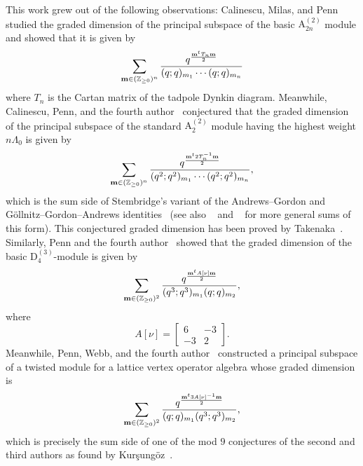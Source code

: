 \documentclass[ALCO,Unicode,published]{cedram}
\begin{document}
This work grew out of the following observations: 
Calinescu, Milas, and Penn~\cite{CalMPe} studied 
the graded dimension of the principal subspace of the basic $\mathrm{A}_{2n}^{(2)}$ module and showed that it is given by 
\begin{equation}\label{A2n-sum}
\sum_{{\bf m} \in (\mathbb{Z}_{\ge 0})^n}\frac{q^{\frac{{\bf m}^t T_n {\bf m}}{2}}}{(q;q)_{m_1}\cdots (q;q)_{m_n}}
\end{equation}
where $T_n$ is the Cartan matrix of the tadpole Dynkin diagram. Meanwhile, Calinescu, Penn, and the fourth author~\cite{CPS} conjectured that the graded dimension of the principal subspace of the 
standard $\mathrm{A}_2^{(2)}$ module having the highest weight $n\Lambda_0$ is given by
\begin{equation}\label{stem-sum}
\sum_{{\bf m} \in (\mathbb{Z}_{\ge 0})^n}\frac{q^{\frac{{\bf m}^t 2T_n^{-1} {\bf m}}{2}}}{(q^2;q^2)_{m_1}\cdots (q^2;q^2)_{m_n}},
\end{equation}
which is the sum side of Stembridge's variant of the Andrews--Gordon and G\"ollnitz--Gordon--Andrews identities~\cite{S} (see also ~\cite{BIS} and ~\cite{War1} for more general sums of this form). This conjectured graded dimension has been proved by Takenaka~\cite{Ta}. Similarly, Penn and the fourth author~\cite{PS1} showed that the graded dimension of the basic $\mathrm{D}_4^{(3)}$-module is given by
\begin{equation}
\label{eqn:d43}
\sum_{{\bf m} \in (\mathbb{Z}_{\ge 0})^2}\frac{q^{\frac{{\bf m}^t A[\nu]  {\bf m}}{2}}}{(q^3;q^3)_{m_1}(q;q)_{m_2}},
\end{equation}
where 
\begin{equation}
A[\nu] = \begin{bmatrix} 6 & -3\\ -3 & 2 \end{bmatrix}.
\end{equation}
Meanwhile, Penn, Webb, and the fourth author~\cite{PSW} constructed a principal subspace of a twisted module for a lattice vertex operator algebra whose graded dimension is
\begin{equation}
\label{eqn:d43inv}
\sum_{{\bf m} \in (\mathbb{Z}_{\ge 0})^2}\frac{q^{\frac{{\bf m}^t 3A[\nu]^{-1}  {\bf m}}{2}}}{(q;q)_{m_1}(q^3;q^3)_{m_2}},
\end{equation}
which is precisely the sum side of one of the mod $9$ conjectures of the second and third authors \cite{KanRus-idf} 
as found by Kur\c{s}ung\"{o}z~\cite{Kur-KR}.
\end{document}
